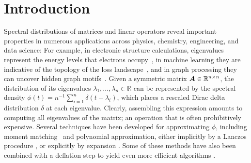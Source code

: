 \section{Introduction}
\label{sec:introduction}

Spectral distributions of matrices and linear operators reveal important properties in numerous applications across physics, chemistry, engineering, and data science: For example, in electronic structure calculations, eigenvalues represent the energy levels that electrons occupy~\cite{drabold-1993-maximum-entropy, ducastelle-1970-moments-developments, haydock-1972-electronic-structure, lin-2017-randomized-estimation}, in machine learning they are indicative of the topology of the loss landscape~\cite{ghorbani-2019-investigation-neural, yao-2020-pyhessian-neural}, and in graph processing they can uncover hidden graph motifs~\cite{huang-2021-density-states}. Given a symmetric matrix $\boldsymbol{A} \in \mathbb{R}^{n \times n}$, the distribution of its eigenvalues $\lambda_1, \dots, \lambda_n \in \mathbb{R}$ can be represented by the spectral density $\phi(t) = n^{-1} \sum_{i=1}^{n} \delta(t - \lambda_i)$, which places a rescaled Dirac delta distribution $\delta$ at each eigenvalue. Clearly, assembling this expression amounts to computing all eigenvalues of the matrix; an operation that is often prohibitively expensive. Several techniques have been developed for approximating $\phi$, including moment matching~\cite{cohen-steiner-2018-approximating-spectrum, braverman-2022-sublinear-time} and polynomial approximation, either implicitly by a Lanczos procedure \cite{lin-2016-approximating-spectral, chen-2021-analysis-stochastic}, or explicitly by expansion \cite{weisse-2006-kernel-polynomial, lin-2016-approximating-spectral}. Some of these methods have also been combined with a deflation step to yield even more efficient algorithms \cite{lin-2017-randomized-estimation, bhattacharjee-2025-improved-spectral}.

